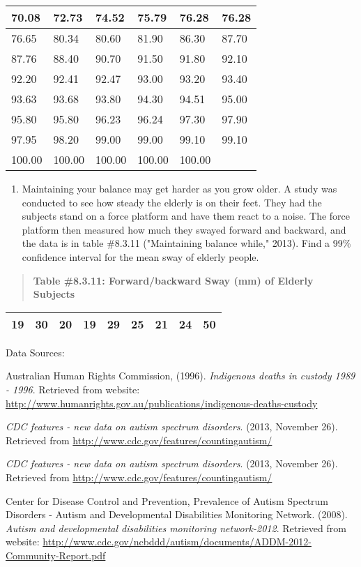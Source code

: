 \documentclass[]{book}
\providecommand{\tightlist}{%
  \setlength{\itemsep}{0pt}\setlength{\parskip}{0pt}}
\begin{document}
\begin{longtable}[]{@{}llllll@{}}
\toprule
70.08 & 72.73 & 74.52 & 75.79 & 76.28 & 76.28\tabularnewline
\midrule
\endhead
76.65 & 80.34 & 80.60 & 81.90 & 86.30 & 87.70\tabularnewline
87.76 & 88.40 & 90.70 & 91.50 & 91.80 & 92.10\tabularnewline
92.20 & 92.41 & 92.47 & 93.00 & 93.20 & 93.40\tabularnewline
93.63 & 93.68 & 93.80 & 94.30 & 94.51 & 95.00\tabularnewline
95.80 & 95.80 & 96.23 & 96.24 & 97.30 & 97.90\tabularnewline
97.95 & 98.20 & 99.00 & 99.00 & 99.10 & 99.10\tabularnewline
100.00 & 100.00 & 100.00 & 100.00 & 100.00 &\tabularnewline
\bottomrule
\end{longtable}

\begin{enumerate}
\def\labelenumi{\arabic{enumi}.}
\setcounter{enumi}{7}
\tightlist
\item
  Maintaining your balance may get harder as you grow older. A study was conducted to see how steady the elderly is on their feet. They had the subjects stand on a force platform and have them react to a noise. The force platform then measured how much they swayed forward and backward, and the data is in table \#8.3.11 ("Maintaining balance while," 2013). Find a 99\% confidence interval for the mean sway of elderly people.
\end{enumerate}

\begin{quote}
\textbf{Table \#8.3.11: Forward/backward Sway (mm) of Elderly Subjects}
\end{quote}

\begin{longtable}[]{@{}lllllllll@{}}
\toprule
\endhead
19 & 30 & 20 & 19 & 29 & 25 & 21 & 24 & 50\tabularnewline
\bottomrule
\end{longtable}

Data Sources:

Australian Human Rights Commission, (1996). \emph{Indigenous deaths in
custody 1989 - 1996}. Retrieved from website:
\url{http://www.humanrights.gov.au/publications/indigenous-deaths-custody}

\emph{CDC features - new data on autism spectrum disorders}. (2013, November
26). Retrieved from \url{http://www.cdc.gov/features/countingautism/}

\emph{CDC features - new data on autism spectrum disorders}. (2013, November
26). Retrieved from \url{http://www.cdc.gov/features/countingautism/}

Center for Disease Control and Prevention, Prevalence of Autism Spectrum
Disorders - Autism and Developmental Disabilities Monitoring Network.
(2008). \emph{Autism and developmental disabilities monitoring network-2012}.
Retrieved from website:
\url{http://www.cdc.gov/ncbddd/autism/documents/ADDM-2012-Community-Report.pdf}
\end{document}
